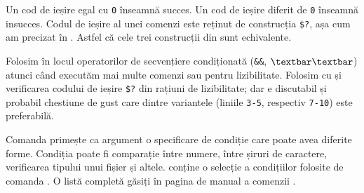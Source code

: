Un cod de ieșire egal cu \texttt{0} înseamnă succes.
Un cod de ieșire diferit de \texttt{0} înseamnă insucces.
Codul de ieșire al unei comenzi este reținut de construcția \texttt{\$?}, așa cum am precizat în .
Astfel că cele trei construcții din  sunt echivalente.


Folosim  în locul operatorilor de secvențiere condiționată (\texttt{\&\&}, \texttt{$\textbar\textbar$}) atunci când executăm mai multe comenzi sau pentru lizibilitate.
Folosim  cu  și verificarea codului de ieșire \texttt{\$?} din rațiuni de lizibilitate; dar e discutabil și probabil chestiune de gust care dintre variantele (liniile \texttt{3-5}, respectiv \texttt{7-10}) este preferabilă.

Comanda  primește ca argument o specificare de condiție care poate avea diferite forme.
Condiția poate fi comparație între numere, între șiruri de caractere, verificarea tipului unui fișier și altele.
 conține o selecție a condițiilor folosite de comanda .
O listă completă găsiți în pagina de manual a comenzii .

